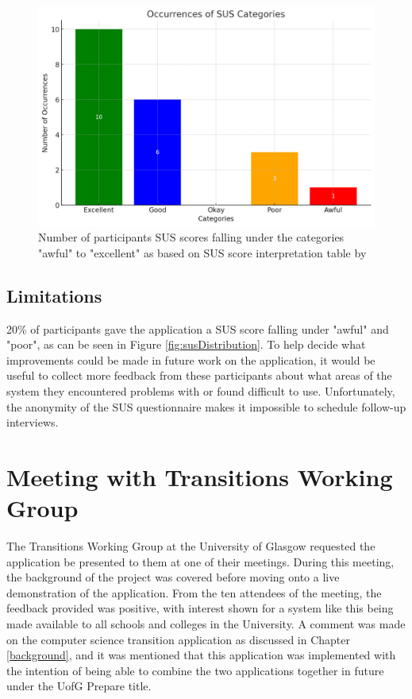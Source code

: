\documentclass{l4proj}
\begin{document}
\begin{figure}[ht]
    \centering
    \includegraphics[width=0.7\linewidth]{images/susOccurences.pdf}    

    \caption{Number of participants SUS scores falling under the categories "awful" to "excellent" as based on SUS score interpretation table by \cite{T_2021}
    }

    \label{fig:susOccurences} 
\end{figure}

\subsection{Limitations}
20\% of participants gave the application a SUS score falling under "awful" and "poor",  as can be seen in Figure \ref{fig:susDistribution}. To help decide what improvements could be made in future work on the application,  it would be useful to collect more feedback from these participants about what areas of the system they encountered problems with or found difficult to use. Unfortunately,  the anonymity of the SUS questionnaire makes it impossible to schedule follow-up interviews.

\section{Meeting with Transitions Working Group} \label{TWG}
The Transitions Working Group at the University of Glasgow requested the application be presented to them at one of their meetings. During this meeting,  the background of the project was covered before moving onto a live demonstration of the application. From the ten attendees of the meeting,  the feedback provided was positive,  with interest shown for a system like this being made available to all schools and colleges in the University. A comment was made on the computer science transition application as discussed in Chapter \ref{background},  and it was mentioned that this application was implemented with the intention of being able to combine the two applications together in future under the UofG Prepare title.
\end{document}
